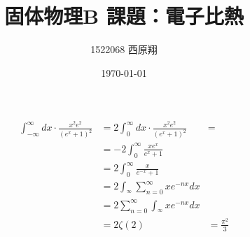 \documentclass[11pt,dvipdfmx,a4paper]{jsarticle}
\title{固体物理B 課題：電子比熱}
\author{1522068 西原翔}
\date{\today}
\begin{document}

\maketitle

\begin{align*}
	\int_{-\infty}^\infty dx \cdot \frac{x^2e^2}{(e^x + 1)^2}&=2\int_{0}^\infty dx \cdot \frac{x^2e^2}{(e^x + 1)^2}&=\\
    &=-2\int_0^\infty \frac{x e^x}{e^x + 1}\\
	&=2\int_0^\infty \frac{x}{e^{-x} + 1}\\
	&=2\int_^\infty \sum_{n=0}^{\infty} xe^{-nx} dx\\
	&=2 \sum_{n=0}^{\infty} \int_^\infty xe^{-nx} dx\\
	&=2 \zeta(2)
	&= \frac{\pi^2}{3}
\end{align*}
\end{document}
